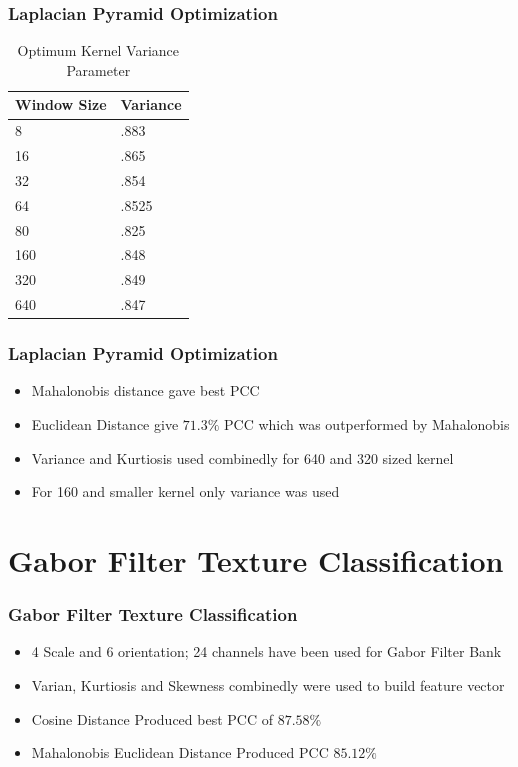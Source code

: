 \documentclass[11pt]{beamer}
\begin{document}
\begin{frame}
\begin{frame}
\frametitle{Laplacian Pyramid Optimization}
\begin{table}[]
\centering
\caption{Optimum Kernel Variance Parameter}
\label{my-label}
\begin{tabular}{@{}ll@{}}
\toprule
Window Size & Variance \\ \midrule
8           & .883     \\
16          & .865     \\
32          & .854     \\
64          & .8525    \\
80          & .825     \\
160         & .848     \\
320         & .849     \\
640         & .847     \\ \bottomrule
\end{tabular}
\end{table}
\end{frame}

\begin{frame}
\frametitle{Laplacian Pyramid Optimization}
\begin{itemize}
	\item Mahalonobis distance gave best PCC
	\item Euclidean Distance give $71.3\%$ PCC which was outperformed by Mahalonobis
	\item Variance and Kurtiosis used combinedly for 640 and 320 sized kernel
	\item For 160 and smaller kernel only variance was used
\end{itemize}
\end{frame}

\section{Gabor Filter Texture Classification}
\begin{frame}
\frametitle{Gabor Filter Texture Classification}
\begin{itemize}
	\item 4 Scale and 6 orientation; 24 channels have been used for Gabor Filter Bank
	\item Varian, Kurtiosis and Skewness combinedly were used to build feature vector
	\item Cosine Distance Produced best PCC of $87.58\%$ 
	\item Mahalonobis Euclidean Distance Produced PCC $85.12\%$
\end{itemize}
\end{frame}


\end{frame}
\end{document}
